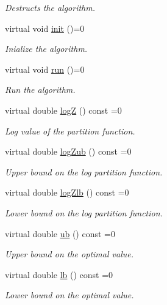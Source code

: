 \begin{DoxyCompactItemize}
\begin{DoxyCompactList}\small\item\em Destructs the algorithm. \end{DoxyCompactList}\item 
virtual void \hyperlink{classmerlin_1_1algorithm_af43f277863c17eeb153c652f9c3c54cd}{init} ()=0
\begin{DoxyCompactList}\small\item\em Inialize the algorithm. \end{DoxyCompactList}\item 
virtual void \hyperlink{classmerlin_1_1algorithm_a6a701ee51b3d1009041702129161b0de}{run} ()=0
\begin{DoxyCompactList}\small\item\em Run the algorithm. \end{DoxyCompactList}\item 
virtual double \hyperlink{classmerlin_1_1algorithm_a26eadf71ba80c0a9cd3d7cfe18c95717}{log\+Z} () const =0
\begin{DoxyCompactList}\small\item\em Log value of the partition function. \end{DoxyCompactList}\item 
virtual double \hyperlink{classmerlin_1_1algorithm_aeece2e8f008bcc94697353088c4afefe}{log\+Zub} () const =0
\begin{DoxyCompactList}\small\item\em Upper bound on the log partition function. \end{DoxyCompactList}\item 
virtual double \hyperlink{classmerlin_1_1algorithm_a14d163a3e90a898487d3a6e273e1fecf}{log\+Zlb} () const =0
\begin{DoxyCompactList}\small\item\em Lower bound on the log partition function. \end{DoxyCompactList}\item 
virtual double \hyperlink{classmerlin_1_1algorithm_a2698bb69f5559889d4903a640f08cd66}{ub} () const =0
\begin{DoxyCompactList}\small\item\em Upper bound on the optimal value. \end{DoxyCompactList}\item 
virtual double \hyperlink{classmerlin_1_1algorithm_adc3f19055c0466682b5577049df14863}{lb} () const =0
\begin{DoxyCompactList}\small\item\em Lower bound on the optimal value. \end{DoxyCompactList}\item 

\end{DoxyCompactItemize}
